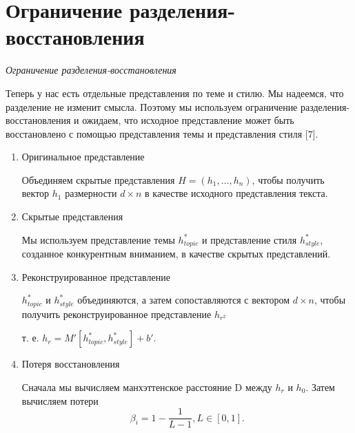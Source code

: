 \section{Ограничение разделения-восстановления}
\begin{center}
\emph{Ограничение разделения-восстановления}
\end{center}

Теперь у нас есть отдельные представления по теме и стилю. Мы надеемся, 
что разделение не изменит смысла. 
Поэтому мы используем ограничение разделения-восстановления и ожидаем, что исходное 
представление может быть восстановлено с помощью представления темы и представления стиля [7].
\begin{enumerate}[label={\arabic*)}, left=10pt]
    \item Оригинальное представление
    \par Объединяем скрытые представления $H = (h_1,\ldots,h_n)$, чтобы получить вектор $h_1$ размерности $d \times n$ в качестве исходного представления текста.
    \item Скрытые представления
    \par Мы используем представление темы $h^{*}_{topic}$
    и представление стиля $h^{*}_{style}$, созданное конкурентным вниманием, в качестве 
    скрытых представлений. 
    \item Реконструированное представление
    \par $h^{*}_{topic}$ и $h^{*}_{style}$ объединяются, а затем сопоставляются 
    с вектором $d \times n$, чтобы получить реконструированное представление $h_{r^2}$
    \par т. е. $h_r=M'[h^{*}_{topic}, h^{*}_{style}]+b'$.
    \item Потеря восстановления
    \par Сначала мы вычисляем манхэттенское расстояние D между $h_r$ и $h_0$.
    Затем вычисляем потери
    \begin{equation*}
        \beta_i = 1-\frac{1}{L-1}, L \in [0, 1].
    \end{equation*} 
\end{enumerate}

